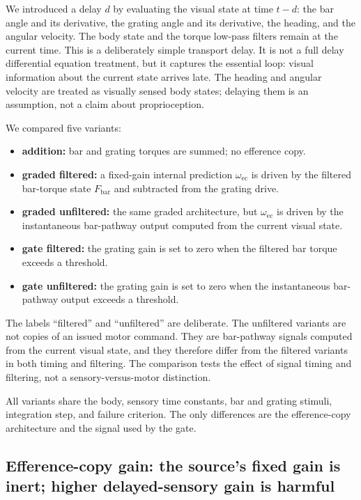 \documentclass[pdflatex,sn-nature]{sn-jnl}
\begin{document}
We introduced a delay $d$ by evaluating the visual state at time $t-d$: the bar angle and its derivative, the grating angle and its derivative, the heading, and the angular velocity. The body state and the torque low-pass filters remain at the current time. This is a deliberately simple transport delay. It is not a full delay differential equation treatment, but it captures the essential loop: visual information about the current state arrives late. The heading and angular velocity are treated as visually sensed body states; delaying them is an assumption, not a claim about proprioception.

We compared five variants:
\begin{itemize}
\item \textbf{addition:} bar and grating torques are summed; no efference copy.
\item \textbf{graded filtered:} a fixed-gain internal prediction $\omega_{\mathrm{ec}}$ is driven by the filtered bar-torque state $F_{\mathrm{bar}}$ and subtracted from the grating drive.
\item \textbf{graded unfiltered:} the same graded architecture, but $\omega_{\mathrm{ec}}$ is driven by the instantaneous bar-pathway output computed from the current visual state.
\item \textbf{gate filtered:} the grating gain is set to zero when the filtered bar torque exceeds a threshold.
\item \textbf{gate unfiltered:} the grating gain is set to zero when the instantaneous bar-pathway output exceeds a threshold.
\end{itemize}

The labels ``filtered'' and ``unfiltered'' are deliberate. The unfiltered variants are not copies of an issued motor command. They are bar-pathway signals computed from the current visual state, and they therefore differ from the filtered variants in both timing and filtering. The comparison tests the effect of signal timing and filtering, not a sensory-versus-motor distinction.

All variants share the body, sensory time constants, bar and grating stimuli, integration step, and failure criterion. The only differences are the efference-copy architecture and the signal used by the gate.

\subsection{Efference-copy gain: the source's fixed gain is inert; higher delayed-sensory gain is harmful}
\end{document}
